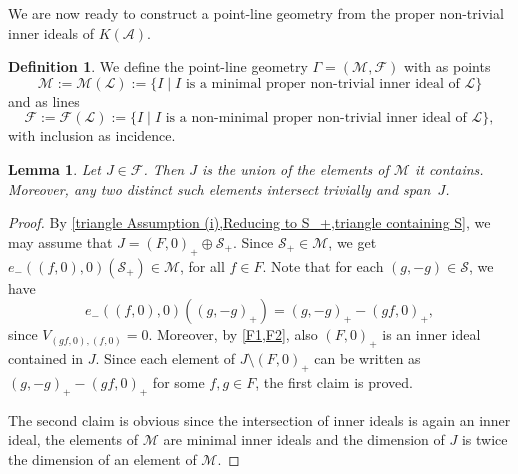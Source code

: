 \documentclass[oneside,a4paper]{amsart} %
\newtheorem{lemma}[theorem]{Lemma}
\theoremstyle{definition}
\newtheorem{definition}[theorem]{Definition}
\newcommand{\A}{\mathcal{A}}
\renewcommand{\SS}{\mathcal{S}}
\newcommand{\LL}{\mathcal{L}}
\newcommand{\F}{\mathcal{F}}
\newcommand{\M}{\mathcal{M}}
\numberwithin{equation}{section}
\begin{document}
We are now ready to construct a point-line geometry from the proper non-trivial inner ideals of $K(\A)$.

\begin{definition}\label{MF}
	We define the point-line geometry $\Gamma = (\M, \F)$ with as points
	\[ \M := \M(\LL) := \{I\mid I\text{ is a minimal proper non-trivial inner ideal of } \LL\} \]
	and as lines
	\[ \F := \F(\LL) := \{I\mid I\text{ is a non-minimal proper non-trivial inner ideal of } \LL\} , \]
	with inclusion as incidence.
\end{definition}

\begin{lemma}
\label{triangle line is full}
	Let $J\in\F$.
	Then $J$ is the union of the elements of $\M$ it contains.
	Moreover, any two distinct such elements intersect trivially and span~$J$.
\end{lemma}
\begin{proof}
	By \cref{triangle Assumption (i),Reducing to S_+,triangle containing S}, we may assume that $J = (F,0)_+ \oplus \SS_+$.
	Since $\SS_+\in \M$, we get $e_-((f,0),0)(\SS_+)\in \M$, for all $f\in F$. 
	Note that for each $(g,-g)\in\SS$, we have
	\[ e_-((f,0),0)((g,-g)_+)=(g,-g)_+-(gf,0)_+ , \]
	since $V_{(gf,0),(f,0)}=0$.
	Moreover, by \cref{F1,F2}, also $(F,0)_+$ is an inner ideal contained in $J$.
	Since each element of $J \setminus (F,0)_+$ can be written as $(g,-g)_+-(gf,0)_+$ for some $f,g \in F$, the first claim is proved.
	
	The second claim is obvious since the intersection of inner ideals is again an inner ideal, the elements of $\M$ are minimal inner ideals and the dimension of $J$ is twice the dimension of an element of $\M$.
\end{proof}
\end{document}
